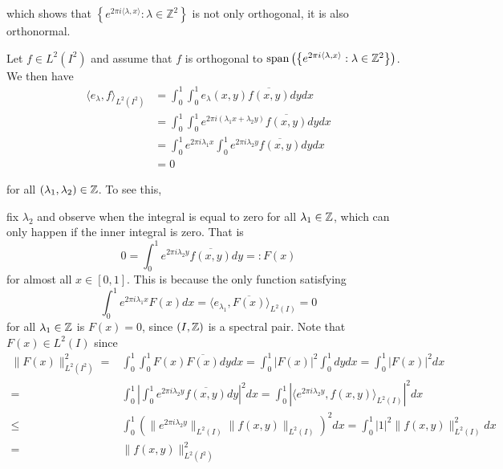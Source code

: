 \documentclass[../thesis.tex]{subfiles}
\begin{document}
which shows that $\left\{ e^{2\pi i \langle \lambda,x  \rangle } : \lambda \in \mathbb{Z}^2\right\}$ is not only orthogonal, it is also orthonormal.


Let $f\in L^2(I^2)$ and assume that $f$ is orthogonal to $\operatorname{span}\left( \left\{ e^{2\pi i \langle \lambda,x  \rangle} : \lambda \in \mathbb{Z}^2\right\} \right)$. We then have
\begin{align*}
    \langle e_\lambda, f \rangle_{L^2(I^2)} &= \int_0^1 \int_0^1 e_\lambda(x,y) \overline{f(x,y)} dydx \\   
    &= \int_0^1 \int_0^1 e^{2\pi i  (\lambda_1x + \lambda_2 y)} \overline{f(x,y)} dydx \\
    &= \int_0^1 e^{2 \pi i \lambda_1 x}\int_0^1 e^{2 \pi i \lambda_2 y} \overline{f(x,y)} dydx \\
    &= 0
\end{align*}

for all $\left(\lambda_1,\lambda_2\right) \in \mathbb{Z}$. To see this, 


fix $\lambda_2$ and observe when the integral is equal to zero for all $\lambda_1\in \mathbb{Z}$, which can only happen if the inner integral is zero. That is 
\begin{equation*}
    0=\int_0^1 e^{2 \pi i \lambda_2 y} \overline{f(x,y)} dy  =: F(x)
\end{equation*}
for almost all $x\in[0,1]$. This is because the only function satisfying 
\begin{equation*}
    \int_0^1 e^{2 \pi i \lambda_1 x} F(x)dx = \langle e_{\lambda_1}, \overline{F(x)}\rangle_{L^2(I)} = 0
\end{equation*}
for all $\lambda_1 \in \mathbb{Z}$ is $F(x)=0$, since $\left(I,\mathbb{Z}\right)$ is a spectral pair. Note that $F(x)\in L^2(I)$ since
\begin{align*}
    \|F(x)\|_{L^2(I^2)}^2 =&  \int_0^1 \int_0^1 F(x) \overline{F(x)} dydx
    = \int_0^1 | F(x)|^2 \int_0^1 dy dx = \int_0^1 | F(x)|^2 dx\\
    =& \int_0^1 \left| \int_0^1 e^{2 \pi i \lambda_2 y} \overline{f(x,y)} dy \right|^2 dx 
    = \int_0^1 \left| \langle e^{2 \pi i \lambda_2 y} , f(x,y) \rangle_{L^2(I)} \right|^2 dx\\
    \leq & \int_0^1 \left( \|e^{2 \pi i \lambda_2 y} \|_{L^2(I)} \|f(x,y) \|_{L^2(I)} \right)^2dx
    = \int_0^1 | 1|^2 \|f(x,y) \|_{L^2(I)}^2 dx\\
    = & \|f(x,y) \|_{L^2(I^2)}^2
\end{align*}



\end{document}
